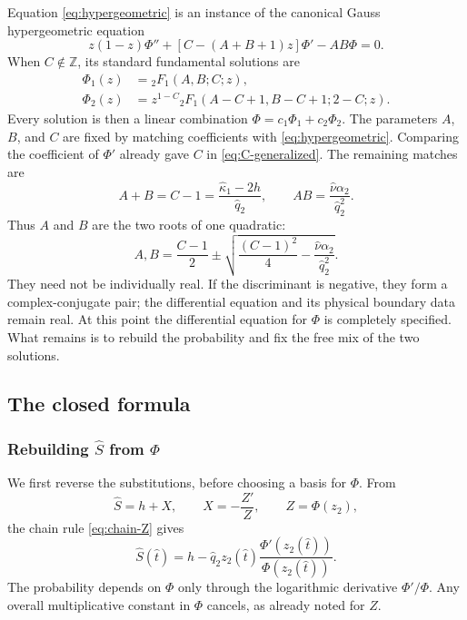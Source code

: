 Equation \eqref{eq:hypergeometric} is an instance of the canonical Gauss hypergeometric equation
\begin{equation*}
z(1-z)\Phi''+[C-(A+B+1)z]\Phi'-AB\Phi=0.
\end{equation*}
When $C\notin\mathbb Z$, its standard fundamental solutions are
\begin{subequations}
\label{eq:gauss-canonical-solutions}
\begin{align}
\Phi_1(z)&={}_2F_1(A,B;C;z),\\
\Phi_2(z)&=z^{1-C}
{}_2F_1(A-C+1,B-C+1;2-C;z).
\end{align}
\end{subequations}
Every solution is then a linear combination $\Phi=c_1\Phi_1+c_2\Phi_2$. The parameters $A$, $B$, and $C$ are fixed by matching coefficients with \cref{eq:hypergeometric}. Comparing the coefficient of $\Phi'$ already gave $C$ in \cref{eq:C-generalized}. The remaining matches are
\begin{equation}
\label{eq:ABC-relations}
A+B=C-1=\frac{\hat\kappa_1-2h}{\hat q_2},
\qquad
AB=\frac{\hat\nu\alpha_2}{\hat q_2^2}.
\end{equation}
Thus $A$ and $B$ are the two roots of one quadratic:
\begin{equation}
\label{eq:AB-explicit}
A,B=\frac{C-1}{2}\mathbin{\pm}
\sqrt{\frac{(C-1)^2}{4}
-\frac{\hat\nu\alpha_2}{\hat q_2^2}}.
\end{equation}
They need not be individually real. If the discriminant is negative, they form a complex-conjugate pair; the differential equation and its physical boundary data remain real. At this point the differential equation for $\Phi$ is completely specified. What remains is to rebuild the probability and fix the free mix of the two solutions.

\subsection{The closed formula}
\label{sec:closed-formula}

\subsubsection{Rebuilding $\widehat S$ from $\Phi$}

We first reverse the substitutions, before choosing a basis for $\Phi$. From
\[
\widehat S=h+X,
\qquad
X=-\frac{Z'}{Z},
\qquad
Z=\Phi(z_2),
\]
the chain rule \cref{eq:chain-Z} gives
\begin{equation}
\label{eq:S-from-Phi}
\widehat S(\hat t)
=h-\hat q_2z_2(\hat t)
\frac{\Phi'(z_2(\hat t))}{\Phi(z_2(\hat t))}.
\end{equation}
The probability depends on $\Phi$ only through the logarithmic derivative $\Phi'/\Phi$. Any overall multiplicative constant in $\Phi$ cancels, as already noted for $Z$.

